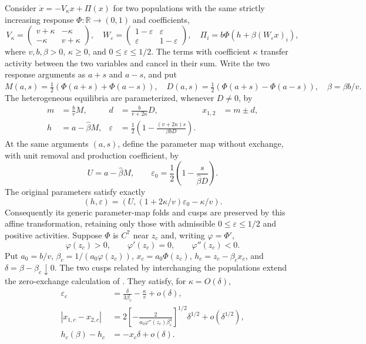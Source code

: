 Consider $\dot x=-V_\kappa x+\Pi(x)$ for two populations with
the same strictly increasing response $\Phi:\mathbb R\to(0,1)$ and coefficients,
\[
 V_\kappa=\begin{pmatrix}v+\kappa&-\kappa\\-\kappa&v+\kappa\end{pmatrix},
 \quad W_\varepsilon=\begin{pmatrix}1-\varepsilon&\varepsilon\\
 \varepsilon&1-\varepsilon\end{pmatrix},
 \quad \Pi_i=b\Phi(h+\beta(W_\varepsilon x)_i),
\]
where $v,b,\beta>0$, $\kappa\ge0$, and
$0\le\varepsilon\le1/2$. The terms with coefficient $\kappa$
transfer activity between the two variables and cancel in their sum.
Write the two response arguments as $a+s$ and $a-s$, and put
\[
 M(a,s)=\tfrac12(\Phi(a+s)+\Phi(a-s)),\quad
 D(a,s)=\tfrac12(\Phi(a+s)-\Phi(a-s)),\quad
 \widehat\beta=\beta b/v.
\]
The heterogeneous equilibria are parameterized, whenever $D\ne0$, by
\begin{align*}
 m&=\frac b v M,&d&=\frac b{v+2\kappa}D,&x_{1,2}&=m\pm d,\\
 h&=a-\widehat\beta M,&
 \varepsilon&=\frac12\left(1-
 \frac{(v+2\kappa)s}{\beta bD}\right).
\end{align*}
At the same arguments $(a,s)$, define the parameter map without exchange,
with unit removal and production coefficient, by
\[
 U=a-\widehat\beta M,\qquad
 \varepsilon_0=\frac12\left(1-\frac{s}{\widehat\beta D}\right).
\]
The original parameters satisfy exactly
\begin{equation}\label{eq:KB-cusp-affine}
 (h,\varepsilon)=
 \left(U,(1+2\kappa/v)\varepsilon_0-\kappa/v\right).
\end{equation}
Consequently its generic parameter-map folds and cusps are preserved
by this affine transformation, retaining only those with admissible
$0\le\varepsilon\le1/2$ and positive activities.
Suppose $\Phi$ is $C^7$ near $z_c$ and, writing $\varphi=\Phi'$,
\[
 \varphi(z_c)>0,\qquad \varphi'(z_c)=0,\qquad
 \varphi''(z_c)<0.
\]
Put $a_0=b/v$, $\beta_c=1/(a_0\varphi(z_c))$,
$x_c=a_0\Phi(z_c)$, $h_c=z_c-\beta_cx_c$, and
$\delta=\beta-\beta_c\downarrow0$.
The two cusps related by interchanging the populations extend the
zero-exchange calculation of \cite{Boud26}. They satisfy,
for $\kappa=O(\delta)$,
\begin{align*}
 \varepsilon_c&=\frac{\delta}{3\beta_c}-\frac\kappa v+o(\delta),\\
 |x_{1,c}-x_{2,c}|&=
 2\left[-\frac{2}{a_0\varphi''(z_c)\beta_c^4}\right]^{1/2}
 \delta^{1/2}+o(\delta^{1/2}),\\
 h_c(\beta)-h_c&=-x_c\delta+o(\delta).
\end{align*}
